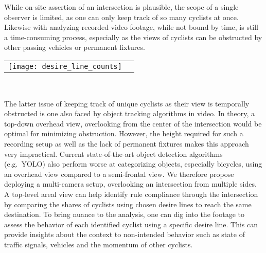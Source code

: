  While on-site assertion of an intersection is plausible, the scope of a single observer is limited, as one can only keep track of 
 so many cyclists at once. Likewise with analyzing recorded video footage, while not bound by time, is still a time-consuming process, 
 especially as the views of cyclists can be obstructed by other passing vehicles or permanent fixtures.
\ \\

\raggedbottom
\noindent
\begin{tabular}{@{}cc}
\texttt{[image: desire\_line\_counts]} 
\end{tabular}
\

The latter issue of keeping track of unique cyclists as their view is temporally obstructed is one also faced by 
object tracking algorithms in video. In theory, a top-down overhead view, overlooking from the center of the intersection would be optimal for minimizing obstruction.
However, the height required for such a recording setup as well as the lack of permanent fixtures makes this approach very impractical. 
Current state-of-the-art object detection algorithms (e.g.~YOLO) also perform worse at categorizing objects, especially bicycles, 
using an overhead view compared to a semi-frontal view. We therefore propose deploying a multi-camera setup, overlooking an intersection from
multiple sides.
\ \\

A top-level areal view can help identify rule compliance through the intersection by comparing
the shares of cyclists using chosen desire lines to reach the same destination. 
To bring nuance to the analysis, one can dig into the footage to assess the behavior of 
each identified cyclist using a specific desire line. 
This can provide insights about the context to non-intended behavior such as state of traffic signals, 
vehicles and the momentum of other cyclists.